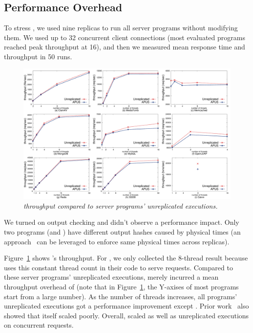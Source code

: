 \subsection{Performance Overhead} \label{sec:overhead}

To stress \xxx, we used nine replicas to run all \nprog server 
programs without modifying them. We used up to 32 concurrent 
client connections (most evaluated programs reached peak throughput at 
16), and then we measured mean response time and throughput in 50 runs.

\begin{figure}[t]
\includegraphics[width=6in]{figures/throughput}
\caption{\small {\em \xxx throughput compared to server programs' unreplicated
executions.}}
\label{fig:tput}
\end{figure}

We turned on output checking and didn't 
observe a performance impact. Only two programs (\mysql and \openldap) 
have different output hashes caused by physical times 
(an approach~\cite{paxos:practical} can be leveraged to enforce same physical 
times across replicas).

Figure~\ref{fig:tput} shows \xxx's throughput. For \calvin, we only collected 
the 8-thread result because \calvin uses this constant thread count in their 
code to serve requests. Compared to these server programs' 
unreplicated executions, \xxx merely incurred a mean throughput overhead of 
\tputoverhead (note that in Figure~\ref{fig:tput}, the Y-axises of most 
programs start from a large number). As the number of threads increases, all 
programs' unreplicated executions got a performance improvement except 
\memcached. Prior work~\cite{rex:eurosys14} also showed that
\memcached itself scaled poorly. Overall, \xxx scaled as well as unreplicated 
executions on concurrent requests.

